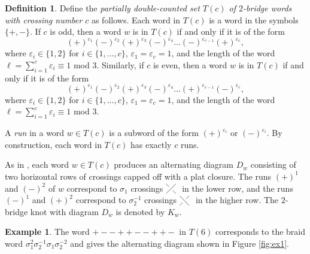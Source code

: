 \documentclass[12pt]{amsart}
\theoremstyle{definition}
\newtheorem{definition}[theorem]{Definition}
\newtheorem{example}[theorem]{Example}
\theoremstyle{remark}
\numberwithin{equation}{section}
\begin{document}
\begin{definition}
\label{def:tc}
\cite{CohLow, CohLowURSI}
Define the \emph{partially double-counted set $T(c)$ of $2$-bridge words with crossing number $c$} as follows. Each word in $T(c)$ is a word in the symbols $\{+,-\}$. If $c$ is odd, then a word $w$ is in $T(c)$ if and only if it is of the form
\[
(+)^{\varepsilon_1}(-)^{\varepsilon_2}(+)^{\varepsilon_3}(-)^{\varepsilon_4}\ldots(-)^{\varepsilon_{c-1}}(+)^{\varepsilon_c}, \]
where $\varepsilon_i\in\{1,2\}$ for $i\in\{1,\ldots,c\}$, $\varepsilon_1=\varepsilon_c=1$, and the length of the word $\ell=\sum_{i=1}^{c}\varepsilon_i \equiv 1$ mod $3$. Similarly, if $c$ is even, then a word $w$ is in $T(c)$ if and only if it is of the form
\[(+)^{\varepsilon_1}(-)^{\varepsilon_2}(+)^{\varepsilon_3}(-)^{\varepsilon_4}\ldots(+)^{\varepsilon_{c-1}}(-)^{\varepsilon_c},\]
where $\varepsilon_i\in\{1,2\}$ for $i\in\{1,\ldots,c\}$, $\varepsilon_1=\varepsilon_c=1$, and the length of the word $\ell=\sum_{i=1}^{c}\varepsilon_i \equiv 1$ mod $3$. 

A \textit{run} in a word $w\in T(c)$ is a subword of the form $(+)^{\varepsilon_i}$ or $(-)^{\varepsilon_i}$. By construction, each word in $T(c)$ has exactly $c$ runs.
\end{definition}

As in \cite{Coh:lower}, each word $w\in T(c)$ produces an alternating diagram $D_w$ consisting of two horizontal rows of crossings capped off with a plat closure. The runs  $(+)^1$ and $(-)^2$ of $w$ correspond to $\sigma_1$ crossings $\tikz[baseline=.6ex, scale = .4]{
\draw (0,0) -- (1,1);
\draw (0,1) -- (.3,.7);
\draw (.7,.3) -- (1,0);
}
~$ in the lower row, and the runs $(-)^1$ and $(+)^2$ correspond to $\sigma_2^{-1}$ crossings $\tikz[baseline=.6ex, scale = .4]{
\draw (0,0) -- (.3,.3);
\draw (.7,.7) -- (1,1);
\draw (0,1) -- (1,0);
}
~$ in the higher row. The $2$-bridge knot with diagram $D_w$ is denoted by $K_w$.

\begin{example}
\label{ex:word}
The word $+--++--++-$ in $T(6)$ corresponds to the braid word $\sigma_1^2\sigma_2^{-1}\sigma_1\sigma_2^{-2}$ and gives the alternating diagram shown in Figure \ref{fig:ex1}.
\end{example}
\end{document}
